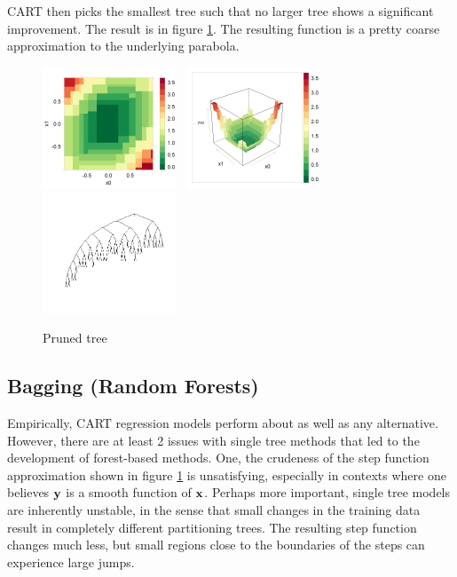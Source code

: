 \documentclass[11pt,openany,american,usenames,dvipsnames,svgnames,x11names,table,isodate]{article}
\numberwithin{equation}{section}
\numberwithin{figure}{section}
\begin{document}
CART then picks the smallest tree such that no larger tree shows a
significant improvement. The result is in figure \ref{fig:pruned-tree}.
The resulting function is a pretty coarse approximation to the underlying
parabola.

\begin{figure}
\noindent \begin{centering}
\includegraphics[width=40mm]{fig/rpart-pruned-levelplot}~
\includegraphics[width=40mm]{fig/rpart-pruned-wireframe}~
\includegraphics[width=40mm]{fig/rpart-pruned-tree}
\par\end{centering}

\protect\caption{\label{fig:pruned-tree}Pruned tree}
\end{figure}

\subsection{Bagging (Random Forests)}

Empirically, CART regression models perform about as well as any alternative.
However, there are at least 2 issues with single tree methods that
led to the development of forest-based methods. One, the crudeness
of the step function approximation shown in figure \ref{fig:pruned-tree}
is unsatisfying, especially in contexts where one believes ${\mathbf y}$ is
a smooth function of ${\mathbf x}$. Perhaps more important, single tree models
are inherently unstable, in the sense that small changes in the training
data result in completely different partitioning trees. The resulting
step function changes much less, but small regions close to the boundaries
of the steps can experience large jumps.
\end{document}
